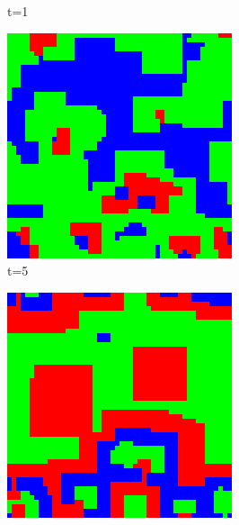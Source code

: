 \documentclass[a4paper, 11pt]{article}
\begin{document}
\begin{landscape}
\begin{figure}[H]
\begin{subfigure}{.20\textwidth}
  \caption{t=1}
\end{subfigure}%
\begin{subfigure}{.20\textwidth}
  \centering
  \includegraphics[width=0.95\linewidth]{ROCK_PAPER_SCISSORS_MOORE_50x50_HighRockPop50_t05}
  \caption{t=5}
\end{subfigure}%
\begin{subfigure}{.20\textwidth}
  \centering
  \includegraphics[width=0.95\linewidth]{ROCK_PAPER_SCISSORS_MOORE_50x50_HighRockPop50_t10}

\end{subfigure}
\end{figure}
\end{landscape}
\end{document}
